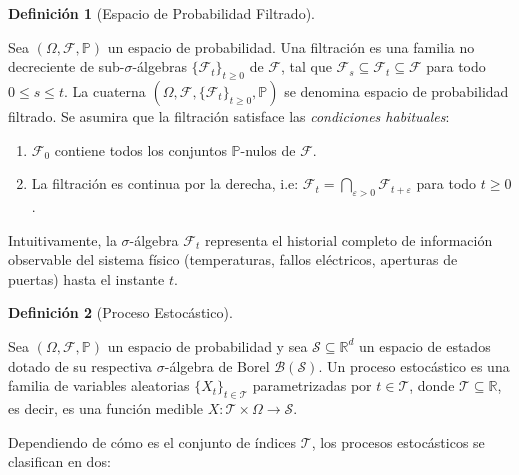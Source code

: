 \documentclass[
  spanish,
  us-letterpaper,
]{scrreprt}
\providecommand{\tightlist}{%
  \setlength{\itemsep}{0pt}\setlength{\parskip}{0pt}}
\numberwithin{equation}{section}
\theoremstyle{plain}
\theoremstyle{plain}
\theoremstyle{plain}
\theoremstyle{definition}
\newtheorem{definition}{Definición}[chapter]
\theoremstyle{remark}
\begin{document}
\begin{definition}[Espacio de Probabilidad
Filtrado]\protect\hypertarget{def-espacio-filtrado}{}\label{def-espacio-filtrado}

Sea \((\Omega, \mathcal{F}, \mathbb{P})\) un espacio de probabilidad.
Una filtración es una familia no decreciente de sub-\(\sigma\)-álgebras
\(\{\mathcal{F}_t\}_{t \ge 0}\) de \(\mathcal{F}\), tal que
\(\mathcal{F}_s \subseteq \mathcal{F}_t \subseteq \mathcal{F}\) para
todo \(0 \le s \le t\). La cuaterna
\((\Omega, \mathcal{F}, \{\mathcal{F}_t\}_{t \ge 0}, \mathbb{P})\) se
denomina espacio de probabilidad filtrado. Se asumira que la filtración
satisface las \emph{condiciones habituales}:

\begin{enumerate}
\def\labelenumi{\arabic{enumi}.}
\tightlist
\item
  \(\mathcal{F}_0\) contiene todos los conjuntos \(\mathbb{P}\)-nulos de
  \(\mathcal{F}\).
\item
  La filtración es continua por la derecha, i.e:
  \(\displaystyle \mathcal{F}_t = \bigcap_{\varepsilon > 0} \mathcal{F}_{t+\varepsilon}\)
  para todo \(t \ge 0\).
\end{enumerate}

\end{definition}

Intuitivamente, la \(\sigma\)-álgebra \(\mathcal{F}_t\) representa el
historial completo de información observable del sistema físico
(temperaturas, fallos eléctricos, aperturas de puertas) hasta el
instante \(t\).

\begin{definition}[Proceso
Estocástico]\protect\hypertarget{def-proceso-estocastico}{}\label{def-proceso-estocastico}

Sea \((\Omega, \mathcal{F}, \mathbb{P})\) un espacio de probabilidad y
sea \(\mathcal{S} \subseteq \mathbb{R}^d\) un espacio de estados dotado
de su respectiva \(\sigma\)-álgebra de Borel
\(\mathcal{B}(\mathcal{S})\). Un proceso estocástico es una familia de
variables aleatorias \(\{X_t\}_{t \in \mathcal{T}}\) parametrizadas por
\(t \in \mathcal{T}\), donde \(\mathcal{T} \subseteq \mathbb{R}\), es
decir, es una función medible
\(X: \mathcal{T} \times \Omega \to \mathcal{S}\).

\end{definition}

Dependiendo de cómo es el conjunto de índices \(\mathcal{T}\), los
procesos estocásticos se clasifican en dos:
\end{document}

